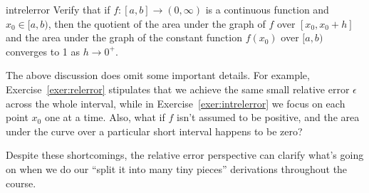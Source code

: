 \documentclass[prettycode,shellescape]{watsonbook}
\begin{document}
\begin{exercise}{}{intrelerror}
  Verify that if $f:[a,b] \to (0,\infty)$ is a continuous function and
  $x_0 \in [a,b)$, then the quotient of the area under the graph of
  $f$ over $[x_0,x_0+h]$ and the area under the graph of the constant
  function $f(x_0)$ over $[a,b)$ converges to 1 as $h \to 0^+$.
\end{exercise}

The above discussion does omit some important details. For example,
Exercise~\ref{exer:relerror} stipulates that we achieve the same small
relative error $\epsilon$ across the whole interval, while in
Exercise~\ref{exer:intrelerror} we focus on each point $x_0$ one at a
time. Also, what if $f$ isn't assumed to be positive, and the area
under the curve over a particular short interval happens to be zero?

Despite these shortcomings, the relative error perspective can clarify
what's going on when we do our ``split it into many tiny
pieces'' derivations throughout the course. 

\newpage 
\end{document}
